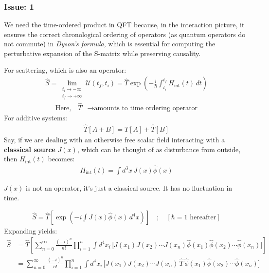 \documentclass[14pt]{article} %
\begin{document}
{\begin{tcolorbox}
\subsubsection*{Issue: 1}
We need the time-ordered product in QFT because, in the interaction picture, it ensures the correct chronological ordering of operators (as quantum operators do not commute) in \textit{Dyson's formula}, which is essential for computing the perturbative expansion of the S-matrix while preserving causality.
\end{tcolorbox}
For scattering, which is also an operator:
\begin{align*}
\hat{S} = \lim_{\substack{t_i \to -\infty \\ t_f \to +\infty}} \mathcal{U}(t_f, t_i) = \hat{T} \exp\left( -\frac{i}{\hbar} \int_{t_i}^{t_f} H_{\text{int}}(t) \, dt \right)
\end{align*}
\begin{align*}
\text{Here,}\quad \hat{T} &\to \text{amounts to time ordering operator}
\end{align*}
For additive systems:
\begin{align*}
\hat{T}[A + B] = \hat{T}[A] + \hat{T}[B]
\end{align*}
Say, if we are dealing with an otherwise free scalar field interacting with a \textbf{classical source} $J(x)$, which can be thought of as disturbance from outside, then $H_{\text{int}}(t)$ becomes:
\begin{align*}
H_{\text{int}}(t) = \int d^3x \, J(x) \hat{\phi}(x)
\end{align*}
\begin{tcolorbox}
$J(x)$ is not an operator, it's just a classical source. It has no fluctuation in time.
\end{tcolorbox}
\begin{align*}
\hat{S} = \hat{T} \left[ \exp\left( -i \int J(x) \hat{\phi}(x) \, d^4x \right) \right] \quad ; \quad [\hbar =1 \,\,\text{hereafter}]
\end{align*}
Expanding yields:
\begin{align*}
\hat{S} &= \hat{T} \left[ \sum_{n=0}^{\infty} \frac{(-i)^n}{n!} \prod_{i=1}^{n} \int d^4x_i \, \big[ J(x_1) J(x_2) \cdots J(x_n) \hat{\phi}(x_1) \hat{\phi}(x_2) \cdots \hat{\phi}(x_n)\big] \right] \\
 &= \sum_{n=0}^{\infty} \frac{(-i)^n}{n!} \prod_{i=1}^{n} \int d^4x_i \, \big[ J(x_1) J(x_2) \cdots J(x_n) \,\hat{T}\, \hat{\phi}(x_1) \hat{\phi}(x_2) \cdots \hat{\phi}(x_n)\big]
\end{align*}
}
\end{document}
